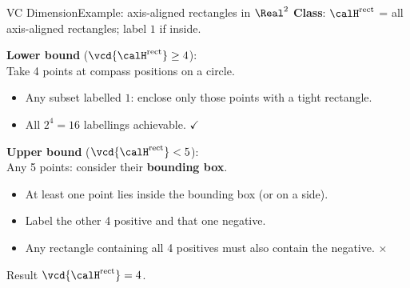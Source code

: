 \begin{frame}{VC Dimension}{Example: axis-aligned rectangles in $\Real^2$}
  \textbf{Class}: $\calH^{\text{rect}}$ = all axis-aligned rectangles; label $1$ if inside.

  \medskip
  \textbf{Lower bound} ($\vcd{\calH^{\text{rect}}} \geq 4$):\\
  Take 4 points at compass positions on a circle.
  \begin{itemize}
    \item Any subset labelled $1$: enclose only those points with a tight rectangle.
    \item All $2^4=16$ labellings achievable. $\checkmark$
  \end{itemize}

  \medskip
  \textbf{Upper bound} ($\vcd{\calH^{\text{rect}}} < 5$):\\
  Any 5 points: consider their \textbf{bounding box}.
  \begin{itemize}
    \item At least one point lies inside the bounding box (or on a side).
    \item Label the other 4 positive and that one negative.
    \item Any rectangle containing all 4 positives must also contain the negative. $\times$
  \end{itemize}

  \begin{block}{Result}
    $\vcd{\calH^{\text{rect}}} = 4$.
  \end{block}
\end{frame}

